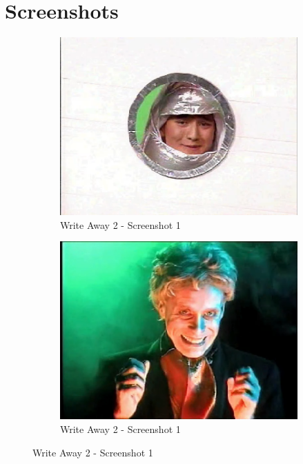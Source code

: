 \clearpage
\newpage

\section{Screenshots}

\begin{figure}[H]
    \centering
    \begin{subfigure}{0.45\textwidth}
        \centering
        \includegraphics[width=\linewidth]{Games/WriteAway/Images/WriteAway2Screenshot1.png}
        \caption{Write Away 2 - Screenshot 1}
    \end{subfigure}
    \begin{subfigure}{0.45\textwidth}
        \centering
        \includegraphics[width=\linewidth]{Games/WriteAway/Images/WriteAway2Screenshot2.png}
        \caption{Write Away 2 - Screenshot 1}
    \end{subfigure}


\end{figure}
